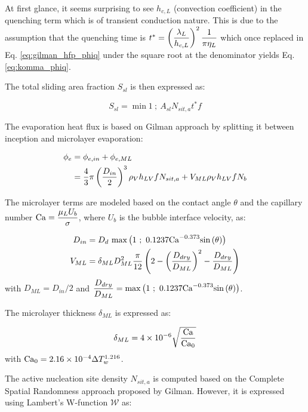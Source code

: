 \begin{note*}{}
At first glance, it seems surprising to see $h_{c,L}$ (convection coefficient) in the quenching term which is of transient conduction nature. This is due to the assumption that the quenching time is $t^{*}=\left( \dfrac{\lambda_{L}}{h_{c,L}} \right)^{2} \dfrac{1}{\pi \eta_{L}}$ which once replaced in Eq. \ref{eq:gilman_hfp_phiq} under the square root at the denominator yields Eq. \ref{eq:komma_phiq}.
\end{note*}

\npar

The total sliding area fraction $S_{sl}$ is then expressed as:

\begin{equation}
S_{sl} = \min{1\ ;\ A_{sl}N_{sit,a}t^{*}f}
\end{equation}

The evaporation heat flux is based on Gilman approach by splitting it between inception and microlayer evaporation:

\begin{align}
\phi_{e} &= \phi_{e,in} + \phi_{e,ML} \\
&= \frac{4}{3}\pi \left( \frac{D_{in}}{2} \right)^{3}\rho_{V} h_{LV} f N_{sit,a} + V_{ML} \rho_{V} h_{LV} f N_{b}
\end{align}


The microlayer terms are modeled based on the contact angle $\theta$ and the capillary number $\mathrm{Ca} = \dfrac{\mu_{L} U_{b}}{\sigma}$, where $U_{b}$ is the bubble interface velocity, as:

\begin{align}
D_{in} &= D_{d}~ \mathrm{max}\left( 1\ ;\ 0.1237\mathrm{Ca}^{-0.373}\mathrm{sin}\left( \theta \right) \right)\\
V_{ML} &= \delta_{ML}D_{ML}^{2} \frac{\pi}{12} \left( 2 - \left( \frac{D_{dry}}{D_{ML}} \right)^{2} - \frac{D_{dry}}{D_{ML}} \right)
\end{align}
with $D_{ML} = D_{in} / 2$ and $\dfrac{D_{dry}}{D_{ML}} = \max{1\ ;\ 0.1237\Ca^{-0.373}\sin{\theta}}$.

\npar

The microlayer thickness $\delta_{ML}$ is expressed as:

\begin{equation}
\delta_{ML}= 4 \times 10^{-6} \sqrt{\frac{\mathrm{Ca}}{\mathrm{Ca}_{0}}}
\end{equation}
with $\mathrm{Ca}_{0} = 2.16 \times 10^{-4} \Delta T_{w}^{1.216}$.


\npar

The active nucleation site density $N_{sit,a}$ is computed based on the Complete Spatial Randomness approach proposed by Gilman. However, it is expressed using Lambert's W-function $\mathcal{W}$ as:

